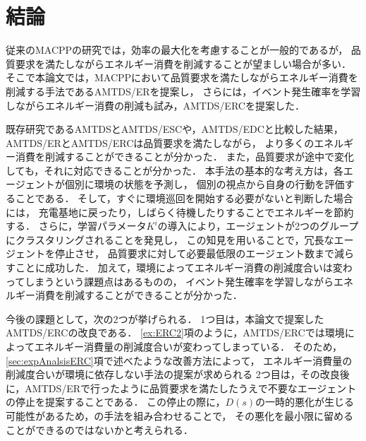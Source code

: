 \documentclass[12pt,a4j,twoside]{jarticle}
\begin{document}
  \section{結論}
  従来のMACPPの研究では，効率の最大化を考慮することが一般的であるが，
  品質要求を満たしながらエネルギー消費を削減することが望ましい場合が多い．
  そこで本論文では，MACPPにおいて品質要求を満たしながらエネルギー消費を削減する手法であるAMTDS/ERを提案し，
  さらには，イベント発生確率を学習しながらエネルギー消費の削減も試み，AMTDS/ERCを提案した．
  \par

  既存研究であるAMTDSとAMTDS/ESCや，AMTDS/EDCと比較した結果，AMTDS/ERとAMTDS/ERCは品質要求を満たしながら，
  より多くのエネルギー消費を削減することができることが分かった．
  また，品質要求が途中で変化しても，それに対応できることが分かった．
  本手法の基本的な考え方は，各エージェントが個別に環境の状態を予測し，
  個別の視点から自身の行動を評価することである．
  そして，すぐに環境巡回を開始する必要がないと判断した場合には，
  充電基地に戻ったり，しばらく待機したりすることでエネルギーを節約する．
  さらに，学習パラメータ$K^i$の導入により，エージェントが2つのグループにクラスタリングされることを発見し，
  この知見を用いることで，冗長なエージェントを停止させ，
  品質要求に対して必要最低限のエージェント数まで減らすことに成功した．
  加えて，環境によってエネルギー消費の削減度合いは変わってしまうという課題点はあるものの，
  イベント発生確率を学習しながらエネルギー消費を削減することができることが分かった．
  \par

  今後の課題として，次の2つが挙げられる．
  1つ目は，本論文で提案したAMTDS/ERCの改良である．
  \ref{ex:ERC2}項のように，AMTDS/ERCでは環境によってエネルギー消費量の削減度合いが変わってしまっている．
  そのため，\ref{sec:expAnalsisERC}項で述べたような改善方法によって，
  エネルギー消費量の削減度合いが環境に依存しない手法の提案が求められる
  2つ目は，その改良後に，AMTDS/ERで行ったように品質要求を満たしたうえで不要なエージェントの停止を提案することである．
  この停止の際に，$D(s)$の一時的悪化が生じる可能性があるため，\cite{Tsuiki2022}の手法を組み合わせることで，
  その悪化を最小限に留めることができるのではないかと考えられる．
  

  \clearpage
  
  
\end{document}
